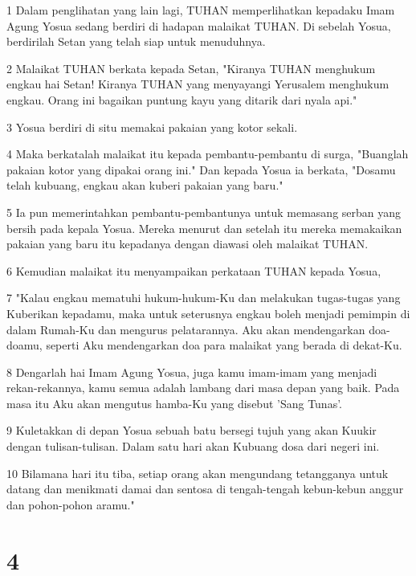 \par 1 Dalam penglihatan yang lain lagi, TUHAN memperlihatkan kepadaku Imam Agung Yosua sedang berdiri di hadapan malaikat TUHAN. Di sebelah Yosua, berdirilah Setan yang telah siap untuk menuduhnya.
\par 2 Malaikat TUHAN berkata kepada Setan, "Kiranya TUHAN menghukum engkau hai Setan! Kiranya TUHAN yang menyayangi Yerusalem menghukum engkau. Orang ini bagaikan puntung kayu yang ditarik dari nyala api."
\par 3 Yosua berdiri di situ memakai pakaian yang kotor sekali.
\par 4 Maka berkatalah malaikat itu kepada pembantu-pembantu di surga, "Buanglah pakaian kotor yang dipakai orang ini." Dan kepada Yosua ia berkata, "Dosamu telah kubuang, engkau akan kuberi pakaian yang baru."
\par 5 Ia pun memerintahkan pembantu-pembantunya untuk memasang serban yang bersih pada kepala Yosua. Mereka menurut dan setelah itu mereka memakaikan pakaian yang baru itu kepadanya dengan diawasi oleh malaikat TUHAN.
\par 6 Kemudian malaikat itu menyampaikan perkataan TUHAN kepada Yosua,
\par 7 "Kalau engkau mematuhi hukum-hukum-Ku dan melakukan tugas-tugas yang Kuberikan kepadamu, maka untuk seterusnya engkau boleh menjadi pemimpin di dalam Rumah-Ku dan mengurus pelatarannya. Aku akan mendengarkan doa-doamu, seperti Aku mendengarkan doa para malaikat yang berada di dekat-Ku.
\par 8 Dengarlah hai Imam Agung Yosua, juga kamu imam-imam yang menjadi rekan-rekannya, kamu semua adalah lambang dari masa depan yang baik. Pada masa itu Aku akan mengutus hamba-Ku yang disebut 'Sang Tunas'.
\par 9 Kuletakkan di depan Yosua sebuah batu bersegi tujuh yang akan Kuukir dengan tulisan-tulisan. Dalam satu hari akan Kubuang dosa dari negeri ini.
\par 10 Bilamana hari itu tiba, setiap orang akan mengundang tetangganya untuk datang dan menikmati damai dan sentosa di tengah-tengah kebun-kebun anggur dan pohon-pohon aramu."

\chapter{4}

